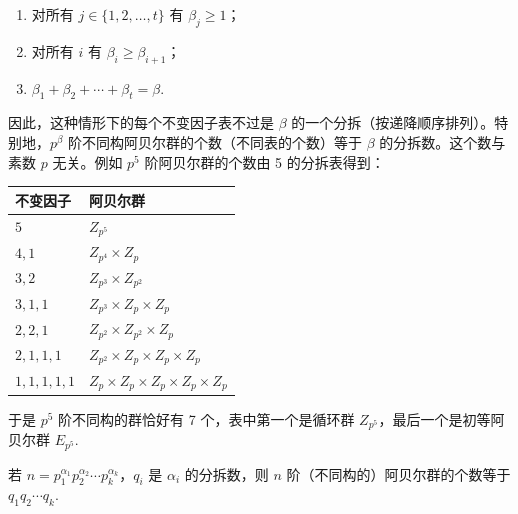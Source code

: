 \begin{enumerate}[label=(\arabic*)]
\item 对所有 \(j \in \{1, 2, \ldots, t\}\) 有 \(\beta_j \geq 1\)；
\item 对所有 \(i\) 有 \(\beta_i \geq \beta_{i+1}\)；
\item \(\beta_1 + \beta_2 + \cdots + \beta_t = \beta\).
\end{enumerate}

因此，这种情形下的每个不变因子表不过是 \(\beta\) 的一个分拆（按递降顺序排列）。特别地，\(p^\beta\) 阶不同构阿贝尔群的个数（不同表的个数）等于 \(\beta\) 的分拆数。这个数与素数 \(p\) 无关。例如 \(p^5\) 阶阿贝尔群的个数由 5 的分拆表得到：

\begin{center}
\begin{tabular}{ll}
\hline
不变因子 & 阿贝尔群 \\
\hline
\(5\) & \(Z_{p^5}\) \\
\(4, 1\) & \(Z_{p^4} \times Z_p\) \\
\(3, 2\) & \(Z_{p^3} \times Z_{p^2}\) \\
\(3, 1, 1\) & \(Z_{p^3} \times Z_p \times Z_p\) \\
\(2, 2, 1\) & \(Z_{p^2} \times Z_{p^2} \times Z_p\) \\
\(2, 1, 1, 1\) & \(Z_{p^2} \times Z_p \times Z_p \times Z_p\) \\
\(1, 1, 1, 1, 1\) & \(Z_p \times Z_p \times Z_p \times Z_p \times Z_p\) \\
\hline
\end{tabular}
\end{center}

于是 \(p^5\) 阶不同构的群恰好有 7 个，表中第一个是循环群 \(Z_{p^5}\)，最后一个是初等阿贝尔群 \(E_{p^5}\).

若 \(n = p_1^{\alpha_1} p_2^{\alpha_2} \cdots p_k^{\alpha_k}\)，\(q_i\) 是 \(\alpha_i\) 的分拆数，则 \(n\) 阶（不同构的）阿贝尔群的个数等于 \(q_1q_2\cdots q_k\).

